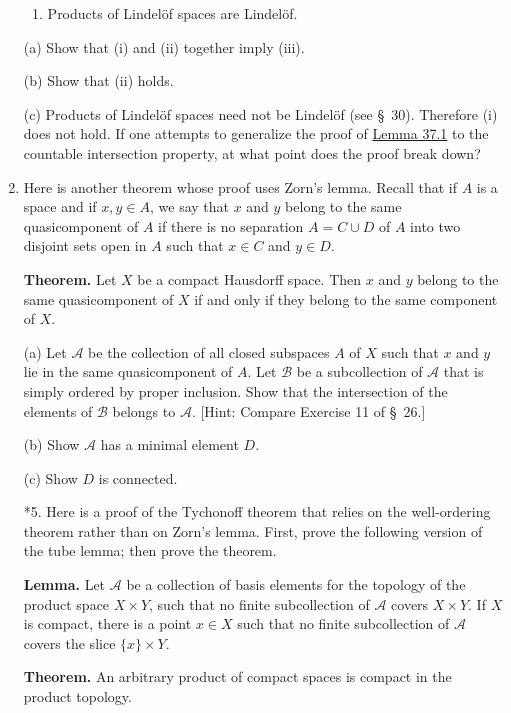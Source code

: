 \begin{enumerate}[itemsep=0.4em, parsep=0pt, topsep=0pt, partopsep=0pt, leftmargin=*, label=\arabic*., ref=\arabic*]
\begin{enumerate}[itemsep=0.2em, parsep=0pt, topsep=0pt, partopsep=0pt, leftmargin=*, label=(\roman*), align=left]
\item Products of Lindelöf spaces are Lindelöf.
\end{enumerate}

(a) Show that (i) and (ii) together imply (iii).

(b) Show that (ii) holds.

(c) Products of Lindelöf spaces need not be Lindelöf (see \S\ 30). Therefore (i) does not hold. If one attempts to generalize the proof of \hyperref[lem:37.1]{Lemma 37.1} to the countable intersection property, at what point does the proof break down?

\item Here is another theorem whose proof uses Zorn's lemma. Recall that if \(A\) is a space and if \(x,y \in A\), we say that \(x\) and \(y\) belong to the same quasicomponent of \(A\) if there is no separation \(A = C \cup D\) of \(A\) into two disjoint sets open in \(A\) such that \(x \in C\) and \(y \in D\).

\textbf{Theorem.} Let \(X\) be a compact Hausdorff space. Then \(x\) and \(y\) belong to the same quasicomponent of \(X\) if and only if they belong to the same component of \(X\).

(a) Let \(\mathcal{A}\) be the collection of all closed subspaces \(A\) of \(X\) such that \(x\) and \(y\) lie in the same quasicomponent of \(A\). Let \(\mathcal{B}\) be a subcollection of \(\mathcal{A}\) that is simply ordered by proper inclusion. Show that the intersection of the elements of \(\mathcal{B}\) belongs to \(\mathcal{A}\). [Hint: Compare Exercise 11 of \S\ 26.]

(b) Show \(\mathcal{A}\) has a minimal element \(D\).

(c) Show \(D\) is connected.

\item[*5.] Here is a proof of the Tychonoff theorem that relies on the well-ordering theorem rather than on Zorn's lemma. First, prove the following version of the tube lemma; then prove the theorem.

\textbf{Lemma.} Let \(\mathcal{A}\) be a collection of basis elements for the topology of the product space \(X \times Y\), such that no finite subcollection of \(\mathcal{A}\) covers \(X \times Y\). If \(X\) is compact, there is a point \(x \in X\) such that no finite subcollection of \(\mathcal{A}\) covers the slice \(\{ x\} \times Y\).

\textbf{Theorem.} An arbitrary product of compact spaces is compact in the product topology.


\end{enumerate}
